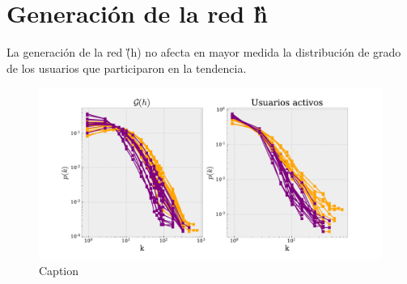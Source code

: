 \documentclass[../main.tex]{subfiles}
\begin{document}
\section{Generación de la red \G{h} }

La generación de la red \G(h) no afecta en mayor medida la distribución de grado de los usuarios que participaron en la tendencia. 

\begin{figure}[h!]
    \centering
    \includegraphics[scale = 0.5]{images/anexo_differencesNetworks.pdf}
    \caption{Caption}
    \label{fig:my_label}
\end{figure}
\end{document}
